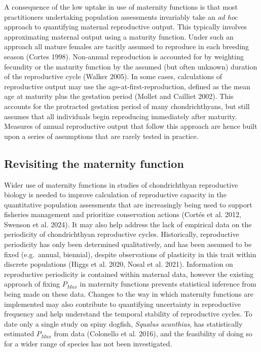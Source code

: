 \documentclass[
]{article}
\begin{document}
A consequence of the low uptake in use of maternity functions is that most practitioners undertaking population assessments invariably take an \emph{ad hoc} approach to quantifying maternal reproductive output. This typically involves approximating maternal output using a maturity function. Under such an approach all mature females are tacitly assumed to reproduce in each breeding season (Cortes 1998). Non-annual reproduction is accounted for by weighting fecundity or the maturity function by the assumed (but often unknown) duration of the reproductive cycle (Walker 2005). In some cases, calculations of reproductive output may use the age-at-first-reproduction, defined as the mean age at maturity plus the gestation period (Mollet and Cailliet 2002). This accounts for the protracted gestation period of many chondrichthyans, but still assumes that all individuals begin reproducing immediately after maturity. Measures of annual reproductive output that follow this approach are hence built upon a series of assumptions that are rarely tested in practice.

\subsection{Revisiting the maternity function}\label{revisiting-the-maternity-function}

Wider use of maternity functions in studies of chondrichthyan reproductive biology is needed to improve calculation of reproductive capacity in the quantitative population assessments that are increasingly being used to support fisheries management and prioritize conservation actions (Cortés et al. 2012, Swenson et al. 2024). It may also help address the lack of empirical data on the periodicity of chondrichthyan reproductive cycles. Historically, reproductive periodicity has only been determined qualitatively, and has been assumed to be fixed (e.g.~annual, biennial), despite observations of plasticity in this trait within discrete populations (Higgs et al. 2020, Nosal et al. 2021). Information on reproductive periodicity is contained within maternal data, however the existing approach of fixing \(P_{Max}\) in maternity functions prevents statistical inference from being made on these data. Changes to the way in which maternity functions are implemented may also contribute to quantifying uncertainty in reproductive frequency and help understand the temporal stability of reproductive cycles. To date only a single study on spiny dogfish, \emph{Squalus acanthias}, has statistically estimated \(P_{Max}\) from data (Colonello et al. 2016), and the feasibility of doing so for a wider range of species has not been investigated.
\end{document}
